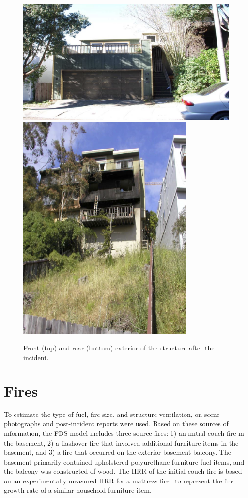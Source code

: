 \documentclass[12pt,oneside]{book}
\begin{document}
\begin{figure}[!ht]
\includegraphics[width=5.50in]{../Figures/Post_Exterior_Front} \\
\vspace{0.1in}
\includegraphics[width=3.50in]{../Figures/Post_Exterior_Rear}
\caption{Front (top) and rear (bottom) exterior of the structure after the incident.}
\label{fig:post_exterior}
\end{figure}

\section{Fires}
\label{sec:fires}

To estimate the type of fuel, fire size, and structure ventilation, on-scene photographs and post-incident reports were used. Based on these sources of information, the FDS model includes three source fires: 1) an initial couch fire in the basement, 2) a flashover fire that involved additional furniture items in the basement, and 3) a fire that occurred on the exterior basement balcony. The basement primarily contained upholstered polyurethane furniture fuel items, and the balcony was constructed of wood. The HRR of the initial couch fire is based on an experimentally measured HRR for a mattress fire~\cite{madrzykowski2009fire} to represent the fire growth rate of a similar household furniture item.
\end{document}
